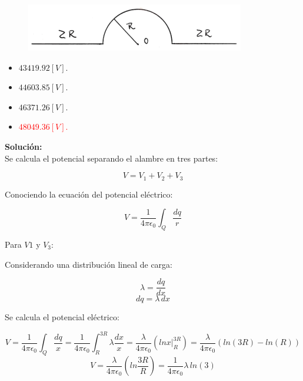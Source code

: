\documentclass[letter,11pt]{article}
\begin{document}
\begin{enumerate}
\begin{figure}[!h]
\centering
\includegraphics[scale=1.80]{resources/q4.eps}
\end{figure}

\begin{itemize}
    \item $43419.92 [V]$.
    \item $44603.85 [V]$.
    \item $46371.26 [V]$.
    \item \textcolor{red}{$48049.36 [V]$.}
\end{itemize}

\textbf{Solución:} \\

Se calcula el potencial separando el alambre en tres partes:

\begin{equation*}
    V = V_1+V_2+V_3
\end{equation*}

Conociendo la ecuación del potencial eléctrico:

\begin{equation*}
    V = \frac{1}{4\pi\epsilon_0}\int_{Q}\frac{dq}{r}
\end{equation*}

Para $V1$ y $V_3$:

Considerando una distribución lineal de carga:

\begin{equation*}
    \lambda = \frac{dq}{dx}
\end{equation*}
\begin{equation*}
    dq = \lambda\,dx
\end{equation*}

Se calcula el potencial eléctrico:

\begin{equation*}
    V = \frac{1}{4\pi\epsilon_0}\int_{Q}\frac{dq}{x}
      = \frac{1}{4\pi\epsilon_0}\int_{R}^{3R}\lambda\frac{dx}{x}
      = \frac{\lambda}{4\pi\epsilon_0}\left(ln x\Biggr|_{R}^{3R}\right)
      = \frac{\lambda}{4\pi\epsilon_0}(ln(3R)-ln(R))
\end{equation*}
\begin{equation*}
    V = \frac{\lambda}{4\pi\epsilon_0}\left(ln \frac{3R}{R}\right)
      = \frac{1}{4\pi\epsilon_0}\lambda\,ln(3)
\end{equation*}


\end{enumerate}
\end{document}
